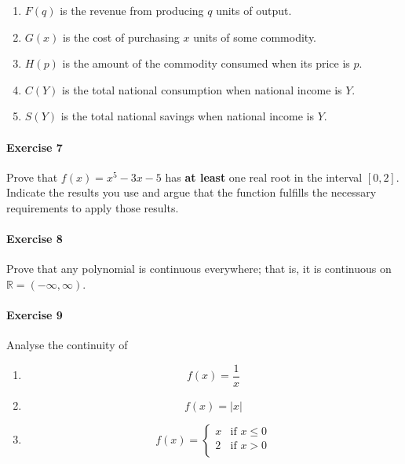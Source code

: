 \documentclass[a4paper,11pt]{article}
\theoremstyle{definition}
\theoremstyle{plain}
\begin{document}
\begin{enumerate}
\def\labelenumi{\arabic{enumi}.}
\item
  \(F(q)\) is the revenue from producing \(q\) units of output.
\item
  \(G(x)\) is the cost of purchasing \(x\) units of some commodity.
\item
  \(H(p)\) is the amount of the commodity consumed when its price is
  \(p\).
\item
  \(C(Y)\) is the total national consumption when national income is
  \(Y\).
\item
  \(S(Y)\) is the total national savings when national income is \(Y\).
\end{enumerate}

\paragraph{Exercise 7}\label{exercise-7}

Prove that \(f(x) = x^5 - 3x - 5\) has \textbf{at least} one real root
in the interval \([0, 2]\). Indicate the results you use and argue that
the function fulfills the necessary requirements to apply those results.

\paragraph{Exercise 8}\label{exercise-8}

Prove that any polynomial is continuous everywhere; that is, it is continuous on $\mathbb{R} = \left(-\infty,\infty\right)$.

\paragraph{Exercise 9}\label{exercise-9}

Analyse the continuity of

\begin{enumerate}
\def\labelenumi{\arabic{enumi}.}
\item
  \[
  f(x) = \frac{1}{x}
  \]

\item
  \[
  f(x) = \lvert x \rvert
  \]
  
\item
  \[
  f(x) = \begin{cases}
  x & \text{if } x \leq 0 \\
  2 & \text{if } x > 0 \\
  \end{cases}
  \]
\end{enumerate}
\end{document}
